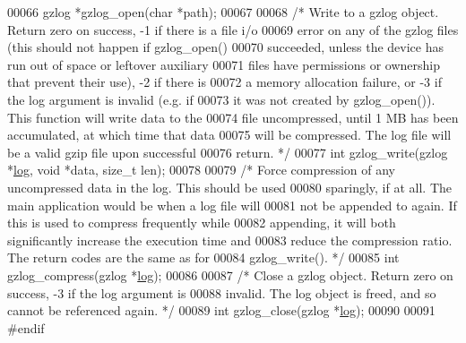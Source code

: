 \begin{DoxyCode}
00066 gzlog *gzlog\_open(\textcolor{keywordtype}{char} *path);
00067 
00068 \textcolor{comment}{/* Write to a gzlog object.  Return zero on success, -1 if there is a file i/o}
00069 \textcolor{comment}{   error on any of the gzlog files (this should not happen if gzlog\_open()}
00070 \textcolor{comment}{   succeeded, unless the device has run out of space or leftover auxiliary}
00071 \textcolor{comment}{   files have permissions or ownership that prevent their use), -2 if there is}
00072 \textcolor{comment}{   a memory allocation failure, or -3 if the log argument is invalid (e.g. if}
00073 \textcolor{comment}{   it was not created by gzlog\_open()).  This function will write data to the}
00074 \textcolor{comment}{   file uncompressed, until 1 MB has been accumulated, at which time that data}
00075 \textcolor{comment}{   will be compressed.  The log file will be a valid gzip file upon successful}
00076 \textcolor{comment}{   return. */}
00077 \textcolor{keywordtype}{int} gzlog\_write(gzlog *\hyperlink{structlog}{log}, \textcolor{keywordtype}{void} *data, \textcolor{keywordtype}{size\_t} len);
00078 
00079 \textcolor{comment}{/* Force compression of any uncompressed data in the log.  This should be used}
00080 \textcolor{comment}{   sparingly, if at all.  The main application would be when a log file will}
00081 \textcolor{comment}{   not be appended to again.  If this is used to compress frequently while}
00082 \textcolor{comment}{   appending, it will both significantly increase the execution time and}
00083 \textcolor{comment}{   reduce the compression ratio.  The return codes are the same as for}
00084 \textcolor{comment}{   gzlog\_write(). */}
00085 \textcolor{keywordtype}{int} gzlog\_compress(gzlog *\hyperlink{structlog}{log});
00086 
00087 \textcolor{comment}{/* Close a gzlog object.  Return zero on success, -3 if the log argument is}
00088 \textcolor{comment}{   invalid.  The log object is freed, and so cannot be referenced again. */}
00089 \textcolor{keywordtype}{int} gzlog\_close(gzlog *\hyperlink{structlog}{log});
00090 
00091 \textcolor{preprocessor}{#endif}
\end{DoxyCode}
